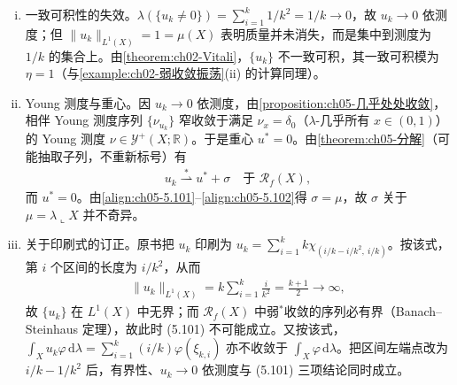 \documentclass[../../main.tex]{subfiles}
\begin{document}
\begin{remark}\label{remark:ch05-集中非奇异注}
\begin{enumerate}[(i)]
\item 一致可积性的失效。$\lambda(\{u_k\neq0\})=\sum_{i=1}^k1/k^2=1/k\to0$，故 $u_k\to0$ 依测度；但 $\|u_k\|_{L^1(X)}=1=\mu(X)$ 表明质量并未消失，而是集中到测度为 $1/k$ 的集合上。由\cref{theorem:ch02-Vitali}，$\{u_k\}$ 不一致可积，其一致可积模为 $\eta=1$（与\cref{example:ch02-弱收敛振荡}(ii) 的计算同理）。

\item Young 测度与重心。因 $u_k\to0$ 依测度，由\cref{proposition:ch05-几乎处处收敛}，相伴 Young 测度序列 $\{\nu_{u_k}\}$ 窄收敛于满足 $\nu_x=\delta_0$（$\lambda$-几乎所有 $x\in(0,1)$）的 Young 测度 $\nu\in\mathcal{Y}^+(X;\mathbb{R})$。于是重心 $u^*=0$。由\cref{theorem:ch05-分解}（可能抽取子列，不重新标号）有
\begin{align}
u_k\stackrel{*}{\rightharpoonup}u^*+\sigma\quad\text{于 }\mathscr{R}_f(X),\label{align:ch05-5.102}
\end{align}
而 $u^*=0$。由\eqref{align:ch05-5.101}--\eqref{align:ch05-5.102}得 $\sigma=\mu$，故 $\sigma$ 关于 $\mu=\lambda\llcorner X$ 并不奇异。

\item 关于印刷式的订正。原书把 $u_k$ 印刷为 $u_k=\sum_{i=1}^kk\chi_{(i/k-i/k^2,\ i/k)}$。按该式，第 $i$ 个区间的长度为 $i/k^2$，从而
\begin{align*}
\|u_k\|_{L^1(X)}=k\sum_{i=1}^k\frac{i}{k^2}=\frac{k+1}{2}\to\infty,
\end{align*}
故 $\{u_k\}$ 在 $L^1(X)$ 中无界；而 $\mathscr{R}_f(X)$ 中弱$^*$收敛的序列必有界（Banach--Steinhaus 定理），故此时 (5.101) 不可能成立。又按该式，$\int_Xu_k\varphi\,\mathrm{d}\lambda=\sum_{i=1}^k(i/k)\varphi(\xi_{k,i})$ 亦不收敛于 $\int_X\varphi\,\mathrm{d}\lambda$。把区间左端点改为 $i/k-1/k^2$ 后，有界性、$u_k\to0$ 依测度与 (5.101) 三项结论同时成立。
\end{enumerate}
\end{remark}
\end{document}
